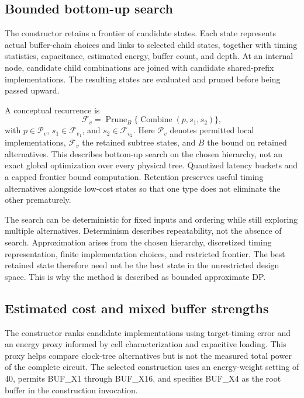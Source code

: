 \documentclass[conference]{IEEEtran}
\begin{document}
\subsection{Bounded bottom-up search}
The constructor retains a frontier of candidate states. Each state represents actual buffer-chain choices and links to selected child states, together with timing statistics, capacitance, estimated energy, buffer count, and depth. At an internal node, candidate child combinations are joined with candidate shared-prefix implementations. The resulting states are evaluated and pruned before being passed upward.

A conceptual recurrence is
\begin{equation}
\mathcal F_v=\operatorname{Prune}_B\{\operatorname{Combine}(p,s_1,s_2)\},
\end{equation}
with $p\in\mathcal P_v$, $s_1\in\mathcal F_{v_1}$, and $s_2\in\mathcal F_{v_2}$. Here $\mathcal P_v$ denotes permitted local implementations, $\mathcal F_v$ the retained subtree states, and $B$ the bound on retained alternatives. This describes bottom-up search on the chosen hierarchy, not an exact global optimization over every physical tree. Quantized latency buckets and a capped frontier bound computation. Retention preserves useful timing alternatives alongside low-cost states so that one type does not eliminate the other prematurely.

The search can be deterministic for fixed inputs and ordering while still exploring multiple alternatives. Determinism describes repeatability, not the absence of search. Approximation arises from the chosen hierarchy, discretized timing representation, finite implementation choices, and restricted frontier. The best retained state therefore need not be the best state in the unrestricted design space. This is why the method is described as bounded approximate DP.

\subsection{Estimated cost and mixed buffer strengths}
The constructor ranks candidate implementations using target-timing error and an energy proxy informed by cell characterization and capacitive loading. This proxy helps compare clock-tree alternatives but is not the measured total power of the complete circuit. The selected construction uses an energy-weight setting of 40, permits BUF\_X1 through BUF\_X16, and specifies BUF\_X4 as the root buffer in the construction invocation.
\end{document}
